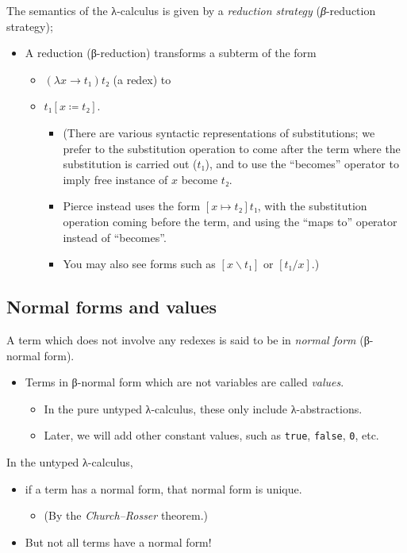 \documentclass[11pt]{article}
\theoremstyle{definition}
\begin{document}
The semantics of the λ-calculus is given by a \emph{reduction strategy}
(\emph{β}-reduction strategy);
\begin{itemize}
\item A reduction (β-reduction) transforms a subterm of the form
\begin{itemize}
\item \((λ x → t₁) t₂\) (a redex) to
\item \(t₁[x ≔ t₂]\).
\begin{itemize}
\item (There are various syntactic representations of substitutions;
we prefer to the substitution operation to come after the term
where the substitution is carried out (\(t₁\)), and to use
the “becomes” operator to imply free instance of \(x\) become \(t₂\).
\item Pierce instead uses the form \([x ↦ t₂]t₁\), with the
substitution operation coming before the term,
and using the “maps to” operator instead of “becomes”.
\item You may also see forms such as \([x\backslash t₁]\) or \([t₁/x]\).)
\end{itemize}
\end{itemize}
\end{itemize}

\subsection{Normal forms and values}
\label{sec:org80211d7}

A term which does not involve any redexes is said to be
in \emph{normal form} (β-normal form).
\begin{itemize}
\item Terms in β-normal form which are not variables
are called \emph{values}.
\begin{itemize}
\item In the pure untyped λ-calculus, these only include λ-abstractions.
\item Later, we will add other constant values,
such as \texttt{true}, \texttt{false}, \texttt{0}, etc.
\end{itemize}
\end{itemize}

In the untyped λ-calculus,
\begin{itemize}
\item if a term has a normal form, that normal form is unique.
\begin{itemize}
\item (By the \emph{Church–Rosser} theorem.)
\end{itemize}
\item But not all terms have a normal form!
\end{itemize}
\end{document}

